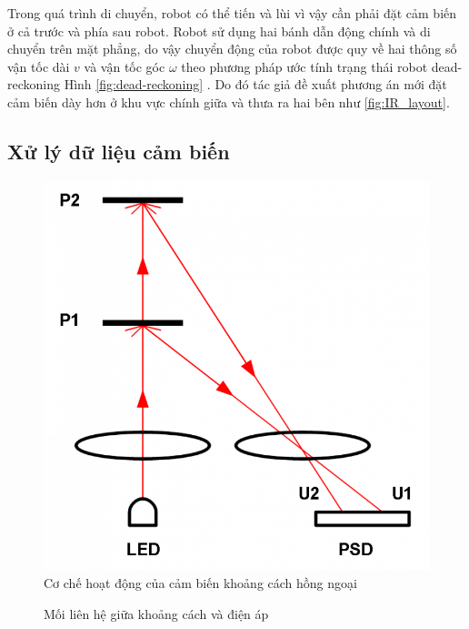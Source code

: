 Trong quá trình di chuyển, robot có thể tiến và lùi vì vậy cần phải đặt cảm biến ở cả trước và phía sau robot.
Robot sử dụng hai bánh dẫn động chính và di chuyển trên mặt phẳng, do vậy chuyển động của robot được quy về hai thông số vận tốc dài $v$ và vận tốc góc $\omega$ theo phương pháp ước tính trạng thái robot dead-reckoning Hình \ref{fig:dead-reckoning} \cite{pyo2017ros}.
Do đó tác giả đề xuất phương án mới đặt cảm biến dày hơn ở khu vực chính giữa và thưa ra hai bên như \figurename{ \ref{fig:IR_layout}}.

\subsection{Xử lý dữ liệu cảm biến}

\begin{figure}[htbp]
    \centering
    \includegraphics[width=0.5\linewidth]{figures/sensor_ir_distance_principle.png}
    \caption{Cơ chế hoạt động của cảm biến khoảng cách hồng ngoại}
    \label{fig:sensor_ir_distance_principle}
\end{figure}

\begin{figure}[htbp]
    \centering
    \caption{Mối liên hệ giữa khoảng cách và điện áp}
    \label{fig:irSharp-vol-distance}
\end{figure}

